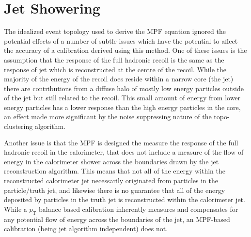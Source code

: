 \section{Jet Showering}
\label{sec:ShoweringIntro}
The idealized event topology used to derive the MPF equation ignored the potential effects of a number of subtle issues which have the potential to affect the accuracy of a calibration derived using this method.
One of these issues is the assumption that the response of the full hadronic recoil is the same as the response of jet which is reconstructed at the centre of the recoil.
While the majority of the energy of the recoil does reside within a narrow core (the jet) there are contributions from a diffuse halo of mostly low energy particles outside of the jet but still related to the recoil.  
This small amount of energy from lower energy particles has a lower response than the high energy particles in the core, an effect made more significant by the noise suppressing nature of the topo-clustering algorithm.

Another issue is that the MPF is designed the measure the response of the full hadronic recoil in the calorimeter, that does not include a measure of the flow of energy in the calorimeter shower across the boundaries drawn by the jet reconstruction algorithm.
This means that not all of the energy within the reconstructed calorimeter jet necessarily originated from particles in the particle/truth jet, and likewise there is no guarantee that all of the energy deposited by particles in the truth jet is reconstructed within the calorimeter jet.
While a $p_{\mathrm T}$ balance based calibration inherently measures and compensates for any potential flow of energy across the boundaries of the jet, an MPF-based calibration (being jet algorithm independent) does not.


